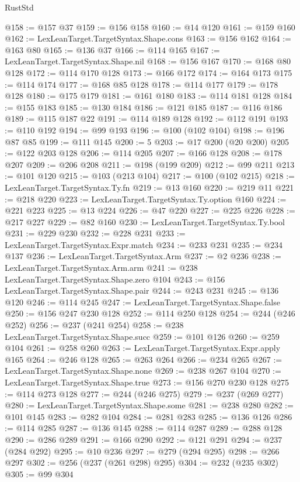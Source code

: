 \begin{lexlean}{RustStd}
\begin{coremodule}
@158 := @157 @37
@159 := @156 @158
@160 := @14 @120
@161 := @159 @160
@162 := LexLeanTarget.TargetSyntax.Shape.cons
@163 := @156 @162
@164 := @163 @80
@165 := @136 @37
@166 := @114 @165
@167 := LexLeanTarget.TargetSyntax.Shape.nil
@168 := @156 @167
@170 := @168 @80 @128
@172 := @114 @170 @128
@173 := @166 @172
@174 := @164 @173
@175 := @114 @174
@177 := @168 @85 @128
@178 := @114 @177
@179 := @178 @128
@180 := @175 @179
@181 := @161 @180
@183 := @114 @181 @128
@184 := @155 @183
@185 := @130 @184
@186 := @121 @185
@187 := @116 @186
@189 := @115 @187 @22
@191 := @114 @189 @128
@192 := @112 @191
@193 := @110 @192
@194 := @99 @193
@196 := @100 (@102 @104)
@198 := @196 @87 @85
@199 := @111 @145
@200 := 5
@203 := @17 @200 (@20 @200)
@205 := @122 @203 @128
@206 := @114 @205
@207 := @166 @128
@208 := @178 @207
@209 := @206 @208
@211 := @198 (@199 @209)
@212 := @99 @211
@213 := @101 @120
@215 := @103 (@213 @104)
@217 := @100 (@102 @215)
@218 := LexLeanTarget.TargetSyntax.Ty.fn
@219 := @13 @160
@220 := @219 @11
@221 := @218 @220
@223 := LexLeanTarget.TargetSyntax.Ty.option @160
@224 := @221 @223
@225 := @13 @224
@226 := @47 @220
@227 := @225 @226
@228 := @217 @227
@229 := @82 @160
@230 := LexLeanTarget.TargetSyntax.Ty.bool
@231 := @229 @230
@232 := @228 @231
@233 := LexLeanTarget.TargetSyntax.Expr.match
@234 := @233 @231
@235 := @234 @137
@236 := LexLeanTarget.TargetSyntax.Arm
@237 := @2 @236
@238 := LexLeanTarget.TargetSyntax.Arm.arm
@241 := @238 LexLeanTarget.TargetSyntax.Shape.zero @104
@243 := @156 LexLeanTarget.TargetSyntax.Shape.pair
@244 := @243 @231
@245 := @136 @120
@246 := @114 @245
@247 := LexLeanTarget.TargetSyntax.Shape.false
@250 := @156 @247 @230 @128
@252 := @114 @250 @128
@254 := @244 (@246 @252)
@256 := @237 (@241 @254)
@258 := @238 LexLeanTarget.TargetSyntax.Shape.succ
@259 := @101 @126
@260 := @259 @104
@261 := @258 @260
@263 := LexLeanTarget.TargetSyntax.Expr.apply @165
@264 := @246 @128
@265 := @263 @264
@266 := @234 @265
@267 := LexLeanTarget.TargetSyntax.Shape.none
@269 := @238 @267 @104
@270 := LexLeanTarget.TargetSyntax.Shape.true
@273 := @156 @270 @230 @128
@275 := @114 @273 @128
@277 := @244 (@246 @275)
@279 := @237 (@269 @277)
@280 := LexLeanTarget.TargetSyntax.Shape.some
@281 := @238 @280
@282 := @101 @145
@283 := @282 @104
@284 := @281 @283
@285 := @136 @126
@286 := @114 @285
@287 := @136 @145
@288 := @114 @287
@289 := @288 @128
@290 := @286 @289
@291 := @166 @290
@292 := @121 @291
@294 := @237 (@284 @292)
@295 := @10 @236
@297 := @279 (@294 @295)
@298 := @266 @297
@302 := @256 (@237 (@261 @298) @295)
@304 := @232 (@235 @302)
@305 := @99 @304

\end{coremodule}
\end{lexlean}
